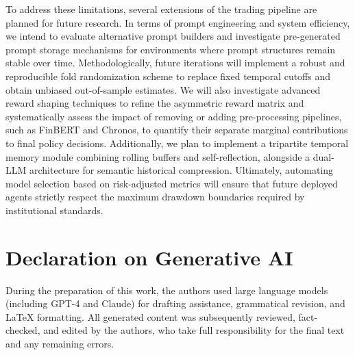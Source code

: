     To address these limitations, several extensions of the trading pipeline are planned for future research. In terms of prompt engineering and system efficiency, we intend to evaluate alternative prompt builders and investigate pre-generated prompt storage mechanisms for environments where prompt structures remain stable over time. Methodologically, future iterations will implement a robust and reproducible fold randomization scheme to replace fixed temporal cutoffs and obtain unbiased out-of-sample estimates. We will also investigate advanced reward shaping techniques to refine the asymmetric reward matrix and systematically assess the impact of removing or adding pre-processing pipelines, such as FinBERT and Chronos, to quantify their separate marginal contributions to final policy decisions. Additionally, we plan to implement a tripartite temporal memory module combining rolling buffers and self-reflection, alongside a dual-LLM architecture for semantic historical compression. Ultimately, automating model selection based on risk-adjusted metrics will ensure that future deployed agents strictly respect the maximum drawdown boundaries required by institutional standards.




    \section{Declaration on Generative AI}

    During the preparation of this work, the authors used large language models (including GPT-4 and Claude) for drafting assistance, grammatical revision, and LaTeX formatting. All generated content was subsequently reviewed, fact-checked, and edited by the authors, who take full responsibility for the final text and any remaining errors.

